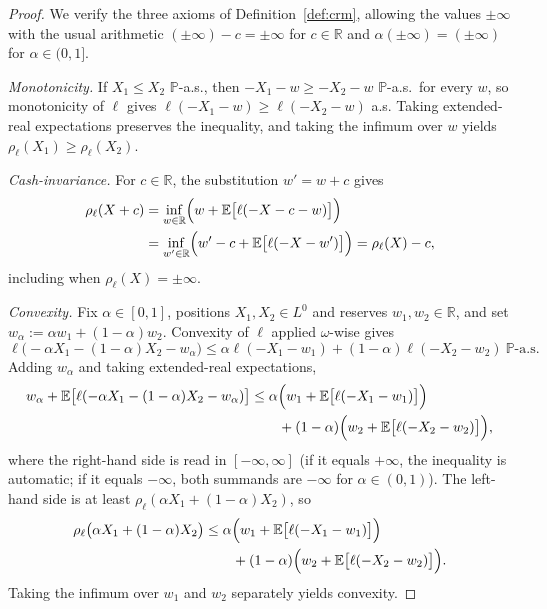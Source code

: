\documentclass[11pt,a4paper]{report}
\numberwithin{equation}{chapter}
\theoremstyle{plain}
\theoremstyle{definition}
\newcommand{\E}{\mathbb{E}}
\newcommand{\PP}{\mathbb{P}}
\newcommand{\R}{\mathbb{R}}
\newcommand{\as}{\ \PP\text{-a.s.}}
\begin{document}
\begin{proof}
    We verify the three axioms of Definition~\ref{def:crm}, allowing the values $\pm\infty$ with the usual arithmetic $(\pm\infty)-c=\pm\infty$ for $c\in\R$ and $\alpha(\pm\infty)=(\pm\infty)$ for $\alpha\in(0,1]$.

    \emph{Monotonicity.} If $X_1\le X_2$ $\PP$-a.s., then $-X_1-w\ge-X_2-w$ $\PP$-a.s.\ for every $w$, so monotonicity of $\ell$ gives $\ell(-X_1-w)\ge\ell(-X_2-w)$ a.s. Taking extended-real expectations preserves the inequality, and taking the infimum over $w$ yields $\rho_\ell(X_1)\ge\rho_\ell(X_2)$.

    \emph{Cash-invariance.} For $c\in\R$, the substitution $w'=w+c$ gives
    \begin{align*}
        \rho_\ell(X+c) & =\inf_{w\in\R}\Bigl(w+\E\bigl[\ell(-X-c-w)\bigr]\Bigr)                    \\
                       & =\inf_{w'\in\R}\Bigl(w'-c+\E\bigl[\ell(-X-w')\bigr]\Bigr)=\rho_\ell(X)-c,
    \end{align*}
    including when $\rho_\ell(X)=\pm\infty$.

    \emph{Convexity.} Fix $\alpha\in[0,1]$, positions $X_1,X_2\in L^0$ and reserves $w_1,w_2\in\R$, and set $w_\alpha:=\alpha w_1+(1-\alpha)w_2$. Convexity of $\ell$ applied $\omega$-wise gives
    \[
        \ell\bigl(-\alpha X_1-(1-\alpha)X_2-w_\alpha\bigr)\le\alpha\ell(-X_1-w_1)+(1-\alpha)\ell(-X_2-w_2)\as
    \]
    Adding $w_\alpha$ and taking extended-real expectations,
    \begin{align*}
        w_\alpha+\E\bigl[\ell(-\alpha X_1-(1-\alpha)X_2-w_\alpha)\bigr]
         & \le\alpha\Bigl(w_1+\E\bigl[\ell(-X_1-w_1)\bigr]\Bigr)          \\
         & \qquad+(1-\alpha)\Bigl(w_2+\E\bigl[\ell(-X_2-w_2)\bigr]\Bigr),
    \end{align*}
    where the right-hand side is read in $[-\infty,\infty]$ (if it equals $+\infty$, the inequality is automatic; if it equals $-\infty$, both summands are $-\infty$ for $\alpha\in(0,1)$). The left-hand side is at least $\rho_\ell(\alpha X_1+(1-\alpha)X_2)$, so
    \begin{align*}
        \rho_\ell\bigl(\alpha X_1+(1-\alpha)X_2\bigr)
         & \le\alpha\Bigl(w_1+\E\bigl[\ell(-X_1-w_1)\bigr]\Bigr)          \\
         & \qquad+(1-\alpha)\Bigl(w_2+\E\bigl[\ell(-X_2-w_2)\bigr]\Bigr).
    \end{align*}
    Taking the infimum over $w_1$ and $w_2$ separately yields convexity.
\end{proof}
\end{document}
